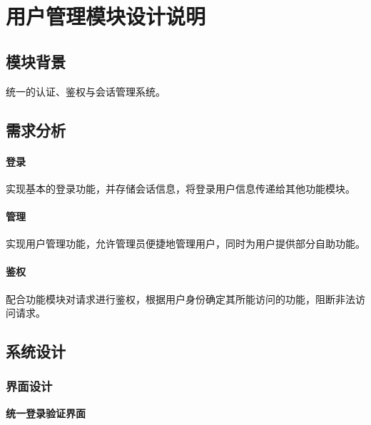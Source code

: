 \documentclass{article}
\begin{document}
\section{用户管理模块设计说明}
\subsection{模块背景}

统一的认证、鉴权与会话管理系统。

\subsection{需求分析}

\paragraph{登录}
实现基本的登录功能，并存储会话信息，将登录用户信息传递给其他功能模块。

\paragraph{管理}
实现用户管理功能，允许管理员便捷地管理用户，同时为用户提供部分自助功能。

\paragraph{鉴权}
配合功能模块对请求进行鉴权，根据用户身份确定其所能访问的功能，阻断非法访问请求。

\subsection{系统设计}
\subsubsection{界面设计}

\begin{center}
\textbf{统一登录验证界面}
\end{center}
\end{document}
